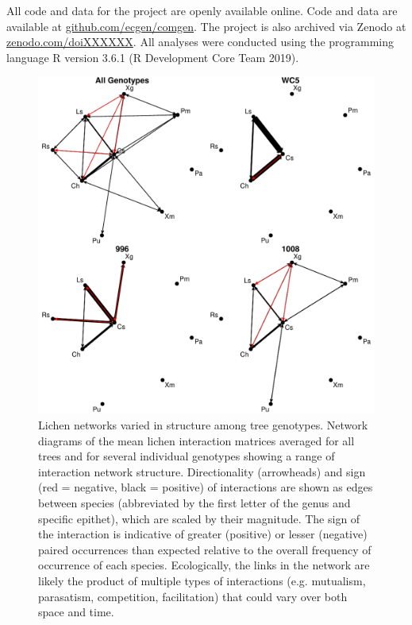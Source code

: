 \documentclass[11pt,twocolumn,twoside,lineno]{pnas-new}
\begin{document}
{All code and data for the project are openly available online. Code
and data are available at \url{github.com/ecgen/comgen}. The project
is also archived via Zenodo at \url{zenodo.com/doiXXXXXX}. All
analyses were conducted using the programming language R version 3.6.1
(R Development Core Team 2019).

\begin{figure}[ht]
\centering
\includegraphics[width=\linewidth]{cn_onc.pdf}
\caption{Lichen networks varied in structure among tree
  genotypes. Network diagrams of the mean lichen interaction matrices
  averaged for all trees and for several individual genotypes showing
  a range of interaction network structure. Directionality
  (arrowheads) and sign (red = negative, black = positive) of
  interactions are shown as edges between species (abbreviated by the
  first letter of the genus and specific epithet), which are scaled by
  their magnitude. The sign of the interaction is indicative of
  greater (positive) or lesser (negative) paired occurrences than
  expected relative to the overall frequency of occurrence of each
  species. Ecologically, the links in the network are likely the
  product of multiple types of interactions (e.g. mutualism,
  parasatism, competition, facilitation) that could vary over both
  space and time.}
\label{fig:geno_nets}
\end{figure}
}
\end{document}
